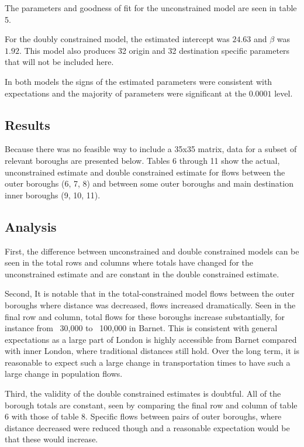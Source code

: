 \documentclass[11pt]{article} %
\begin{document}
The parameters and goodness of fit for the unconstrained model are seen in table 5.

For the doubly constrained model, the estimated intercept was $24.63$ and $\beta$ was $1.92$. This model also produces 32 origin and 32 destination specific parameters that will not be included here. 

In both models the signs of the estimated parameters were consistent with expectations and the majority of parameters were significant at the $0.0001$ level.

\subsection{Results}

Because there was no feasible way to include a 35x35 matrix, data for a subset of relevant boroughs are presented below. Tables 6 through 11 show the actual, unconstrained estimate and double constrained estimate for flows between the outer boroughs (6, 7, 8) and between some outer boroughs and main destination inner boroughs (9, 10,  11). 



\subsection{Analysis}

First, the difference between unconstrained and double constrained models can be seen in the total rows and columns where totals have changed for the unconstrained estimate and are constant in the double constrained estimate. 

Second, It is notable that in the total-constrained model flows between the outer boroughs where distance was decreased, flows increased dramatically. Seen in the final row and column, total flows for these boroughs increase substantially, for instance from ~30,000 to ~100,000 in Barnet. This is consistent with general expectations as a large part of London is highly accessible from Barnet compared with inner London, where traditional distances still hold. Over the long term, it is reasonable to expect such a large change in transportation times to have such a large change in population flows. 

Third, the validity of the double constrained estimates is doubtful. All of the borough totals are constant, seen by comparing the final row and column of table 6 with those of table 8. Specific flows between pairs of outer boroughs, where distance decreased were reduced though and a reasonable expectation would be that these would increase. 
\end{document}
